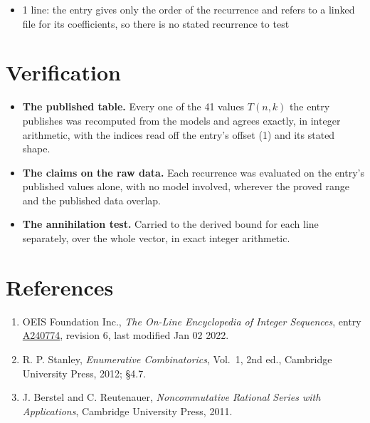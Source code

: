 \documentclass[11pt]{article}
\theoremstyle{definition}
\begin{document}
\begin{itemize}

\item 1 line: the entry gives only the order of the recurrence and refers to a linked file for its coefficients, so there is no stated recurrence to test

\end{itemize}

\section{Verification}

\begin{itemize}

\item {\bfseries The published table.} Every one of the 41 values $T(n,k)$ the entry publishes was recomputed from the models and agrees exactly, in integer arithmetic, with the indices read off the entry's offset (1) and its stated shape.

\item {\bfseries The claims on the raw data.} Each recurrence was evaluated on the entry's published values alone, with no model involved, wherever the proved range and the published data overlap.

\item {\bfseries The annihilation test.} Carried to the derived bound for each line separately, over the whole vector, in exact integer arithmetic.

\end{itemize}

\section{References}

\begin{enumerate}

\item OEIS Foundation Inc., \emph{The On-Line Encyclopedia of Integer Sequences}, entry \href{https://oeis.org/A240774}{A240774}, revision 6, last modified Jan 02 2022.

\item R. P. Stanley, \emph{Enumerative Combinatorics}, Vol.~1, 2nd ed., Cambridge University Press, 2012; \S4.7.

\item J. Berstel and C. Reutenauer, \emph{Noncommutative Rational Series with Applications}, Cambridge University Press, 2011.

\end{enumerate}
\end{document}

